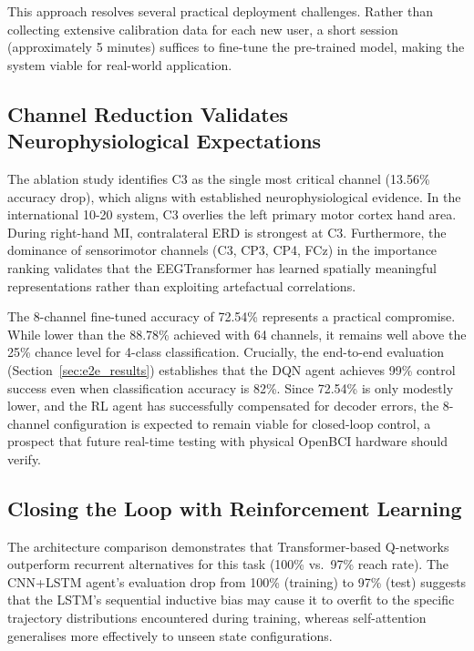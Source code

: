 \documentclass[12pt, a4paper]{article}
\begin{document}
This approach resolves several practical deployment challenges. Rather than collecting extensive calibration data for each new user, a short session (approximately 5 minutes) suffices to fine-tune the pre-trained model, making the system viable for real-world application.

\subsection{Channel Reduction Validates Neurophysiological Expectations}

The ablation study identifies C3 as the single most critical channel (13.56\% accuracy drop), which aligns with established neurophysiological evidence. In the international 10-20 system, C3 overlies the left primary motor cortex hand area. During right-hand MI, contralateral ERD is strongest at C3. Furthermore, the dominance of sensorimotor channels (C3, CP3, CP4, FCz) in the importance ranking validates that the EEGTransformer has learned spatially meaningful representations rather than exploiting artefactual correlations.

The 8-channel fine-tuned accuracy of 72.54\% represents a practical compromise. While lower than the 88.78\% achieved with 64 channels, it remains well above the 25\% chance level for 4-class classification. Crucially, the end-to-end evaluation (Section~\ref{sec:e2e_results}) establishes that the DQN agent achieves 99\% control success even when classification accuracy is 82\%. Since 72.54\% is only modestly lower, and the RL agent has successfully compensated for decoder errors, the 8-channel configuration is expected to remain viable for closed-loop control, a prospect that future real-time testing with physical OpenBCI hardware should verify.

\subsection{Closing the Loop with Reinforcement Learning}

The architecture comparison demonstrates that Transformer-based Q-networks outperform recurrent alternatives for this task (100\% vs.~97\% reach rate). The CNN+LSTM agent's evaluation drop from 100\% (training) to 97\% (test) suggests that the LSTM's sequential inductive bias may cause it to overfit to the specific trajectory distributions encountered during training, whereas self-attention generalises more effectively to unseen state configurations.
\end{document}
